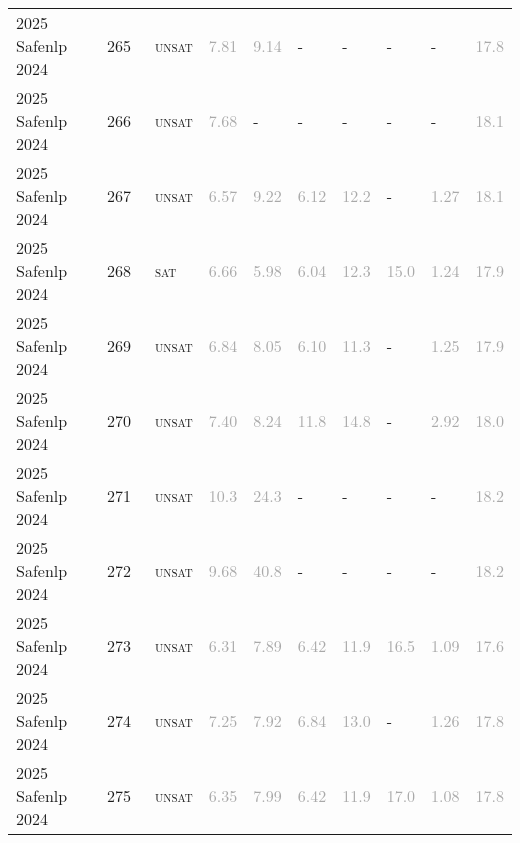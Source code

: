 \begin{center}
{\begin{longtable}{@{}llllllllll@{}}
2025 Safenlp 2024 & 265 & ~\textsc{unsat} & \textcolor{darkgray}{7.81} & \textcolor{darkgray}{9.14} & - & - & - & - & \textcolor{darkgray}{17.8} \\
2025 Safenlp 2024 & 266 & ~\textsc{unsat} & \textcolor{darkgray}{7.68} & - & - & - & - & - & \textcolor{darkgray}{18.1} \\
2025 Safenlp 2024 & 267 & ~\textsc{unsat} & \textcolor{darkgray}{6.57} & \textcolor{darkgray}{9.22} & \textcolor{darkgray}{6.12} & \textcolor{darkgray}{12.2} & - & \textcolor{darkgray}{1.27} & \textcolor{darkgray}{18.1} \\
2025 Safenlp 2024 & 268 & ~\textsc{sat} & \textcolor{darkgray}{6.66} & \textcolor{darkgray}{5.98} & \textcolor{darkgray}{6.04} & \textcolor{darkgray}{12.3} & \textcolor{darkgray}{15.0} & \textcolor{darkgray}{1.24} & \textcolor{darkgray}{17.9} \\
2025 Safenlp 2024 & 269 & ~\textsc{unsat} & \textcolor{darkgray}{6.84} & \textcolor{darkgray}{8.05} & \textcolor{darkgray}{6.10} & \textcolor{darkgray}{11.3} & - & \textcolor{darkgray}{1.25} & \textcolor{darkgray}{17.9} \\
2025 Safenlp 2024 & 270 & ~\textsc{unsat} & \textcolor{darkgray}{7.40} & \textcolor{darkgray}{8.24} & \textcolor{darkgray}{11.8} & \textcolor{darkgray}{14.8} & - & \textcolor{darkgray}{2.92} & \textcolor{darkgray}{18.0} \\
2025 Safenlp 2024 & 271 & ~\textsc{unsat} & \textcolor{darkgray}{10.3} & \textcolor{darkgray}{24.3} & - & - & - & - & \textcolor{darkgray}{18.2} \\
2025 Safenlp 2024 & 272 & ~\textsc{unsat} & \textcolor{darkgray}{9.68} & \textcolor{darkgray}{40.8} & - & - & - & - & \textcolor{darkgray}{18.2} \\
2025 Safenlp 2024 & 273 & ~\textsc{unsat} & \textcolor{darkgray}{6.31} & \textcolor{darkgray}{7.89} & \textcolor{darkgray}{6.42} & \textcolor{darkgray}{11.9} & \textcolor{darkgray}{16.5} & \textcolor{darkgray}{1.09} & \textcolor{darkgray}{17.6} \\
2025 Safenlp 2024 & 274 & ~\textsc{unsat} & \textcolor{darkgray}{7.25} & \textcolor{darkgray}{7.92} & \textcolor{darkgray}{6.84} & \textcolor{darkgray}{13.0} & - & \textcolor{darkgray}{1.26} & \textcolor{darkgray}{17.8} \\
2025 Safenlp 2024 & 275 & ~\textsc{unsat} & \textcolor{darkgray}{6.35} & \textcolor{darkgray}{7.99} & \textcolor{darkgray}{6.42} & \textcolor{darkgray}{11.9} & \textcolor{darkgray}{17.0} & \textcolor{darkgray}{1.08} & \textcolor{darkgray}{17.8} \\

\end{longtable}}
\end{center}
